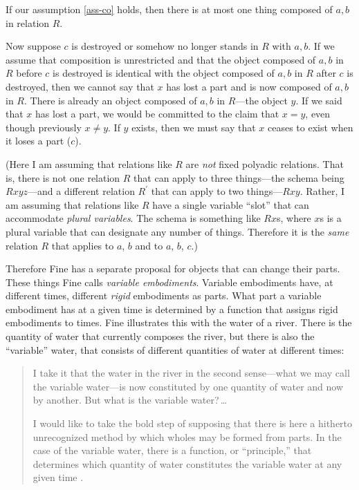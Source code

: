 \documentclass[12pt,twoside]{reedfancy}
\begin{document}
\begin{spacing}{1.25}
If our assumption \ref{ass-co} holds, then there is at most one thing
composed of $a, b$ in relation $R$.

Now suppose $c$ is destroyed or somehow no longer stands in $R$ with
$a, b$.  If we assume that composition is unrestricted and that the
object composed of $a, b$ in $R$ before $c$ is destroyed is identical
with the object composed of $a, b$ in $R$ after $c$ is destroyed, then
we cannot say that $x$ has lost a part and is now composed of $a, b$
in $R$.  There is already an object composed of $a, b$ in $R$---the
object $y$.  If we said that $x$ has lost a part, we would be
committed to the claim that $x = y$, even though previously $x \neq
y$.  If $y$ exists, then we must say that $x$ ceases to exist when it
loses a part ($c$).

(Here I am assuming that relations like $R$ are {\em not} fixed
polyadic relations.  That is, there is not one relation $R$ that can
apply to three things---the schema being $Rxyz$---and a different
relation $R^{\prime}$ that can apply to two things---$Rxy$.  Rather, I
am assuming that relations like $R$ have a single variable ``slot''
that can accommodate {\em plural variables}.  The schema is something
like $Rx$s, where $x$s is a plural variable that can designate any
number of things.  Therefore it is the {\em same} relation $R$ that
applies to $a$, $b$ and to $a$, $b$, $c$.)

Therefore Fine has a separate proposal for objects that can change
their parts.  These things Fine calls {\em variable embodiments}.
Variable embodiments have, at different times, different {\em rigid}
embodiments as parts.  What part a variable embodiment has at a given
time is determined by a function that assigns rigid embodiments to
times.  Fine illustrates this with the water of a river.  There is the
quantity of water that currently composes the river, but there is also
the ``variable'' water, that consists of different quantities of water
at different times:

\begin{quote}
I take it that the water in the river in the second sense---what we may
call the variable water---is now constituted by one quantity of water
and now by another. But what is the variable water?\,\ldots

I would like to take the bold step of supposing that there is here a
hitherto unrecognized method by which wholes may be formed from parts.
In the case of the variable water, there is a function, or
``principle,'' that determines which quantity of water constitutes the
variable water at any given time \citeyearpar[68]{fine1999}.
\end{quote}


\end{spacing}
\end{document}
